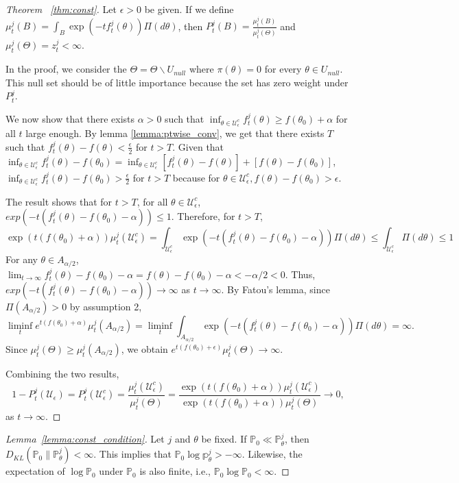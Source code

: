 \documentclass[twoside,11pt]{article}
\numberwithin{equation}{section}
\newcommand{\U}{\mathcal{U}}
\newcommand\bP{\mathbb{P}}
\newcommand\bp{\mathbb{p}}
\begin{document}
{\begin{proof}[Theorem ~\ref{thm:const}]
Let $\epsilon > 0$ be given. If we define $\mu_t^j(B) = \int_B \exp(-t f_t^j(\theta)) \Pi(d\theta) $, then $P_t^j(B) = \frac{\mu_t^j(B)}{\mu_t^j(\Theta)}$ and $\mu_t^j(\Theta)  = z_t^j < \infty$. 

In the proof, we consider the $\Theta = \Theta \backslash U_{null}$ where $\pi(\theta) = 0$ for every $\theta \in U_{null}$. This null set should be of little importance because the set has zero weight under $P_t^j$. 

We now show that there exists $\alpha > 0$ such that $\inf_{\theta \in \U_\epsilon^c} f_t^j (\theta) \geq  f(\theta_0) + \alpha$ for all $t$ large enough.  By lemma \ref{lemma:ptwise_conv}, we get that there exists $T$ such that $f_t^j (\theta) - f (\theta) < \frac{\epsilon}{2}$ for $t > T$. Given that $\inf_{\theta \in \U_\epsilon^c} f_t^j (\theta) -f(\theta_0) = \inf_{\theta \in \U_\epsilon^c} [f_t^j (\theta) - f (\theta)] + [f(\theta) -f(\theta_0)]$, $\inf_{\theta \in \U_\epsilon^c} f_t^j (\theta) -f(\theta_0) > \frac{\epsilon}{2}$ for $t > T$ because for $\theta \in \U_\epsilon^c, f(\theta) -f(\theta_0) > \epsilon$. 

The result shows that for $t > T$, for all $\theta \in \U_\epsilon^c$, $exp(-t(f_t^j(\theta) - f(\theta_0) - \alpha)) \leq 1$. Therefore, for $t > T$, 
\begin{equation*}
    \exp(t(f(\theta_0) + \alpha)) \mu_t^j (\U_\epsilon^c) = \int_{\U_\epsilon^c} \exp(-t(f_t^j(\theta) - f(\theta_0) - \alpha)) \Pi(d\theta) \leq \int_{\U_\epsilon^c} \Pi(d\theta) \leq 1
\end{equation*}
For any $\theta \in A_{\alpha/2}$, $\lim_{t \to \infty} f_t^j(\theta) - f(\theta_0) - \alpha = f(\theta) - f(\theta_0) - \alpha < -\alpha /2 < 0$. Thus, $exp(-t(f_t^j(\theta) - f(\theta_0) - \alpha)) \to \infty$ as $t \to \infty$. By Fatou's lemma, since $\Pi(A_{\alpha/2}) > 0$ by assumption 2, 
\begin{equation*}
    \liminf_{t} e^{t(f(\theta_0) + \alpha)} \mu_t^j(A_{\alpha/2}) =  \liminf_{t} \int_{A_{\alpha/2}} \exp(-t(f_t^j(\theta) - f(\theta_0) - \alpha)) \Pi(d\theta) = \infty. 
\end{equation*}
%
Since $\mu_t^j(\Theta) \geq \mu_t^j(A_{\alpha/2})$, we obtain $e^{t(f(\theta_0) + \epsilon)} \mu_t^j(\Theta) \to \infty$. 

Combining the two results, 
\begin{equation*}
 1 - P_t^j(\U_\epsilon) = P_t^j(\U_\epsilon^c) =  \frac{\mu_t^j(\U_\epsilon^c)}{\mu_t^j(\Theta)} = \frac{\exp(t(f(\theta_0) + \alpha))\mu_t^j(\U_\epsilon^c)}{\exp(t(f(\theta_0) + \alpha))\mu_t^j(\Theta)} \to 0, 
\end{equation*}
as $t \to \infty$. 
\end{proof}
\begin{proof}[Lemma~\ref{lemma:const_condition}]
Let $j$ and $\theta$ be fixed. If $\bP_0 \ll \bP_\theta^j$, then $D_{KL}(\bP_0 \parallel \bP_\theta^j) < \infty$. This implies that $\bP_0 \log \bp_\theta^j > - \infty$. Likewise, the expectation of $\log \bP_0$ under $\bP_0$ is also finite, i.e., $\bP_0 \log \bP_0 < \infty$.


\end{proof}}
\end{document}
